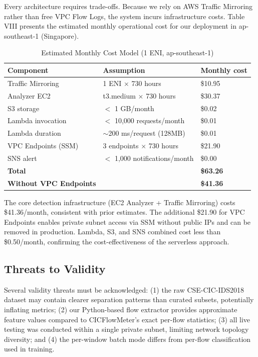 \documentclass[conference]{IEEEtran}
\begin{document}
Every architecture requires trade-offs. Because we rely on AWS Traffic Mirroring rather than free VPC Flow Logs, the system incurs infrastructure costs. Table VIII presents the estimated monthly operational cost for our deployment in ap-southeast-1 (Singapore).

\begin{table}[!ht]
\centering
\caption{Estimated Monthly Cost Model (1 ENI, ap-southeast-1)}
\footnotesize
\setlength{\tabcolsep}{3pt}
\begin{tabulary}{\linewidth}{|l|L|L|}
\hline
\textbf{Component} & \textbf{Assumption} & \textbf{Monthly cost} \\
\hline
Traffic Mirroring & 1 ENI $\times$ 730 hours & \$10.95 \\
Analyzer EC2 & t3.medium $\times$ 730 hours & \$30.37 \\
S3 storage & $<$ 1 GB/month & \$0.02 \\
Lambda invocation & $<$ 10,000 requests/month & \$0.01 \\
Lambda duration & $\sim$200 ms/request (128MB) & \$0.01 \\
VPC Endpoints (SSM) & 3 endpoints $\times$ 730 hours & \$21.90 \\
SNS alert & $<$ 1,000 notifications/month & \$0.00 \\
\textbf{Total} &  & \textbf{\$63.26} \\
\textbf{Without VPC Endpoints} & & \textbf{\$41.36} \\
\hline
\end{tabulary}
\end{table}

The core detection infrastructure (EC2 Analyzer + Traffic Mirroring) costs \$41.36/month, consistent with prior estimates. The additional \$21.90 for VPC Endpoints enables private subnet access via SSM without public IPs and can be removed in production. Lambda, S3, and SNS combined cost less than \$0.50/month, confirming the cost-effectiveness of the serverless approach.

\subsection{Threats to Validity}

Several validity threats must be acknowledged: (1) the raw CSE-CIC-IDS2018 dataset may contain clearer separation patterns than curated subsets, potentially inflating metrics; (2) our Python-based flow extractor provides approximate feature values compared to CICFlowMeter's exact per-flow statistics; (3) all live testing was conducted within a single private subnet, limiting network topology diversity; and (4) the per-window batch mode differs from per-flow classification used in training.
\end{document}
